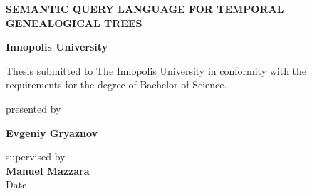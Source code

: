 \begin{titlepage}

\begin{center}

\textbf{\Large{SEMANTIC QUERY LANGUAGE FOR TEMPORAL GENEALOGICAL TREES}}
\vspace{4cm}

\textbf{\Large Innopolis University} \\

\vspace{0.60cm}

{\Large Thesis submitted to The Innopolis University in conformity with the
requirements for the degree of Bachelor of Science.}

\vspace{6cm}

{\Large presented by}

\vspace{0.40cm}

\textbf{\Large Evgeniy Gryaznov}
\vspace{0.40cm}

{\Large supervised by}\\
\vspace{0.40cm}
{\bf\Large Manuel Mazzara}\\
\vspace{0.60cm}
{\Large Date}



\end{center}
\end{titlepage}
